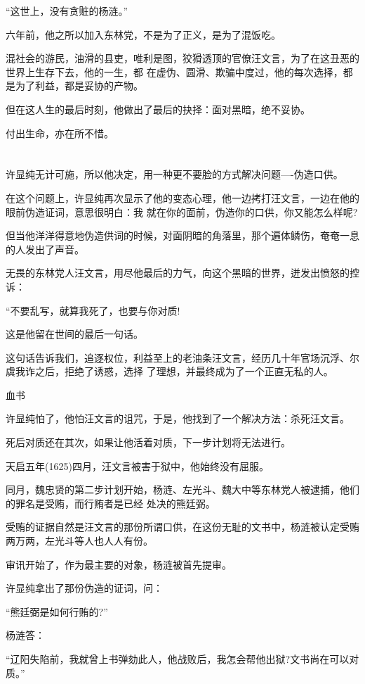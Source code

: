 \documentclass[11pt,a4paper,onecolumn]{article}
\begin{document}
``这世上，没有贪赃的杨涟。''

六年前，他之所以加入东林党，不是为了正义，是为了混饭吃。

混社会的游民，油滑的县吏，唯利是图，狡猾透顶的官僚汪文言，为了在这丑恶的世界上生存下去，他的一生，都
在虚伪、圆滑、欺骗中度过，他的每次选择，都是为了利益，都是妥协的产物。

但在这人生的最后时刻，他做出了最后的抉择：面对黑暗，绝不妥协。

付出生命，亦在所不惜。

\section[\thesection]{}

许显纯无计可施，所以他决定，用一种更不要脸的方式解决问题----伪造口供。

在这个问题上，许显纯再次显示了他的变态心理，他一边拷打汪文言，一边在他的眼前伪造证词，意思很明白：我
就在你的面前，伪造你的口供，你又能怎么样呢?

但当他洋洋得意地伪造供词的时候，对面阴暗的角落里，那个遍体鳞伤，奄奄一息的人发出了声音。

无畏的东林党人汪文言，用尽他最后的力气，向这个黑暗的世界，迸发出愤怒的控诉：

``不要乱写，就算我死了，也要与你对质!

这是他留在世间的最后一句话。

这句话告诉我们，追逐权位，利益至上的老油条汪文言，经历几十年官场沉浮、尔虞我诈之后，拒绝了诱惑，选择
了理想，并最终成为了一个正直无私的人。

血书

许显纯怕了，他怕汪文言的诅咒，于是，他找到了一个解决方法：杀死汪文言。

死后对质还在其次，如果让他活着对质，下一步计划将无法进行。

天启五年(1625)四月，汪文言被害于狱中，他始终没有屈服。

同月，魏忠贤的第二步计划开始，杨涟、左光斗、魏大中等东林党人被逮捕，他们的罪名是受贿，而行贿者是已经
处决的熊廷弼。

受贿的证据自然是汪文言的那份所谓口供，在这份无耻的文书中，杨涟被认定受贿两万两，左光斗等人也人人有份。

审讯开始了，作为最主要的对象，杨涟被首先提审。

许显纯拿出了那份伪造的证词，问：

``熊廷弼是如何行贿的?''

杨涟答：

``辽阳失陷前，我就曾上书弹劾此人，他战败后，我怎会帮他出狱?文书尚在可以对质。''
\end{document}
